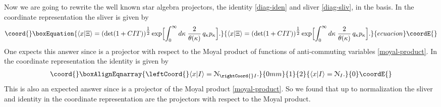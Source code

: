 \documentclass[a4paper,12pt]{article}
\providecommand{\Nc}{\mathcal{N}}
\begin{document}
Now we
are going to rewrite the well known star algebra projectors,
the identity \eqref{diag-iden}
and sliver \eqref{diag-sliv},
in the \coordHE{} basis.
In the coordinate representation the sliver is given by
\begin{equation}\coord{}\boxEquation{
\langle
x|\Xi\rangle=(\det(1+CIT))^{\tfrac12}
\exp\Bigl[\int_{0}^{\infty}d\kappa\;
\frac{2}{\theta(\kappa)}\,q_{\kappa}p_{\kappa}\Bigr].
}{
\langle
x|\Xi\rangle=(\det(1+CIT))^{\tfrac12}
\exp\Bigl[\int_{0}^{\infty}d\kappa\;
\frac{2}{\theta(\kappa)}\,q_{\kappa}p_{\kappa}\Bigr].
}{ecuacion}\coordE{}\end{equation}
One expects this answer since \coordHE{}
is a projector with respect to the Moyal product of functions of anti-commuting
variables \eqref{moyal-product}.
In the coordinate representation the identity is given by
\begin{gather}\coord{}\boxAlignEqnarray{
\leftCoord{}\langle x|I\rangle=\Nc_{\rightCoord{}I}.
}{0mm}{1}{2}{
\langle x|I\rangle=\Nc_{I}.
}{0}\coordE{}\end{gather}
This is also an expected answer since \coordHE{} is a projector of the
Moyal product \eqref{moyal-product}.
So we found that up to normalization
the sliver and identity in the coordinate representation
are the projectors with respect to the Moyal product.
\end{document}
